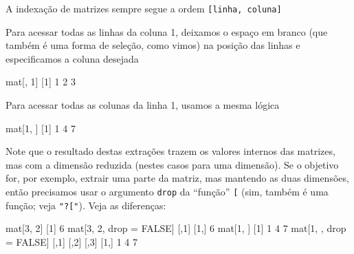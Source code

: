 \documentclass[
  10pt,
  a4paper]{book}
\newenvironment{Shaded}{\begin{snugshade}}{\end{snugshade}}
\newcommand{\ConstantTok}[1]{\textcolor[rgb]{0.00,0.00,0.00}{#1}}
\newcommand{\DecValTok}[1]{\textcolor[rgb]{0.00,0.00,0.81}{#1}}
\newcommand{\NormalTok}[1]{#1}
\newcommand{\OtherTok}[1]{\textcolor[rgb]{0.56,0.35,0.01}{#1}}
\begin{document}
A indexação de matrizes sempre segue a ordem \texttt{{[}linha,\ coluna{]}}

Para acessar todas as linhas da coluna 1, deixamos o espaço em branco
(que também é uma forma de seleção, como vimos) na posição das linhas e
especificamos a coluna desejada

\begin{Shaded}
\begin{Highlighting}[]
\NormalTok{mat[, }\DecValTok{1}\NormalTok{]}
\NormalTok{[}\DecValTok{1}\NormalTok{] }\DecValTok{1} \DecValTok{2} \DecValTok{3}
\end{Highlighting}
\end{Shaded}

Para acessar todas as colunas da linha 1, usamos a mesma lógica

\begin{Shaded}
\begin{Highlighting}[]
\NormalTok{mat[}\DecValTok{1}\NormalTok{, ]}
\NormalTok{[}\DecValTok{1}\NormalTok{] }\DecValTok{1} \DecValTok{4} \DecValTok{7}
\end{Highlighting}
\end{Shaded}

Note que o resultado destas extrações trazem os valores internos das
matrizes, mas com a dimensão reduzida (nestes casos para uma
dimensão). Se o objetivo for, por exemplo, extrair uma parte da matriz,
mas mantendo as duas dimensões, então precisamos usar o argumento \texttt{drop}
da ``função'' \texttt{{[}} (sim, também é uma função; veja \texttt{"?{[}"}).
Veja as diferenças:

\begin{Shaded}
\begin{Highlighting}[]
\NormalTok{mat[}\DecValTok{3}\NormalTok{, }\DecValTok{2}\NormalTok{]}
\NormalTok{[}\DecValTok{1}\NormalTok{] }\DecValTok{6}
\NormalTok{mat[}\DecValTok{3}\NormalTok{, }\DecValTok{2}\NormalTok{, drop }\OtherTok{=} \ConstantTok{FALSE}\NormalTok{]}
\NormalTok{     [,}\DecValTok{1}\NormalTok{]}
\NormalTok{[}\DecValTok{1}\NormalTok{,]    }\DecValTok{6}
\NormalTok{mat[}\DecValTok{1}\NormalTok{, ]}
\NormalTok{[}\DecValTok{1}\NormalTok{] }\DecValTok{1} \DecValTok{4} \DecValTok{7}
\NormalTok{mat[}\DecValTok{1}\NormalTok{, , drop }\OtherTok{=} \ConstantTok{FALSE}\NormalTok{]}
\NormalTok{     [,}\DecValTok{1}\NormalTok{] [,}\DecValTok{2}\NormalTok{] [,}\DecValTok{3}\NormalTok{]}
\NormalTok{[}\DecValTok{1}\NormalTok{,]    }\DecValTok{1}    \DecValTok{4}    \DecValTok{7}
\end{Highlighting}
\end{Shaded}
\end{document}
